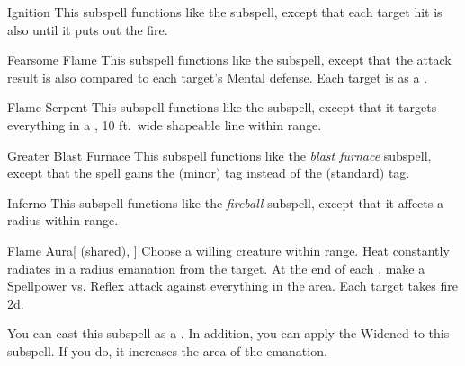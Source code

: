\begin{ability}[\nth{3}]{Ignition}
This subspell functions like the  subspell, except that each target hit is also  until it puts out the fire.
\end{ability}
\vspace{0.25em}


\begin{ability}[\nth{4}]{Fearsome Flame}
This subspell functions like the  subspell, except that the attack result is also compared to each target's Mental defense.
\hit Each target is  as a .
\end{ability}
\vspace{0.25em}


\begin{ability}[\nth{4}]{Flame Serpent}
This subspell functions like the  subspell, except that it targets everything in a \arealarge, 10 ft.\ wide shapeable line within \rngmed range.
\end{ability}
\vspace{0.25em}


\begin{ability}[\nth{5}]{Greater Blast Furnace}
This subspell functions like the \textit{blast furnace} subspell, except that the spell gains the  (minor) tag instead of the  (standard) tag.
\end{ability}
\vspace{0.25em}


\begin{ability}[\nth{5}]{Inferno}
This subspell functions like the \textit{fireball} subspell, except that it affects a \arealarge radius within \rngmed range.
\end{ability}
\vspace{0.25em}


\begin{ability}[\nth{6}]{Flame Aura}[ (shared), ]
Choose a willing creature within \rngclose range.
Heat constantly radiates in a \areamed radius emanation from the target.
At the end of each , make a Spellpower vs. Reflex attack against everything in the area.
\hit Each target takes fire  \minus2d.

You can cast this subspell as a .
In addition, you can apply the Widened  to this subspell.
If you do, it increases the area of the emanation.
\end{ability}
\vspace{0.25em}


